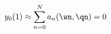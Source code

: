 \begin{equation}
y_0 (1) \approx \sum\limits_{n=0}^{N} a_n (\wn,\qn) = 0\,
\label{frobeniuszero_1}
\end{equation}

